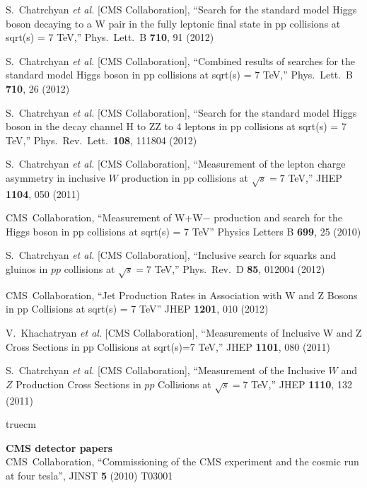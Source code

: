   S.~Chatrchyan {\it et al.}  [CMS Collaboration],
  ``Search for the standard model Higgs boson decaying to a W pair in the fully leptonic final state in pp collisions at sqrt(s) = 7 TeV,''
  Phys.\ Lett.\ B {\bf 710}, 91 (2012)

  S.~Chatrchyan {\it et al.}  [CMS Collaboration],
  ``Combined results of searches for the standard model Higgs boson in pp collisions at sqrt(s) = 7 TeV,''
  Phys.\ Lett.\ B {\bf 710}, 26 (2012)

  S.~Chatrchyan {\it et al.}  [CMS Collaboration],
  ``Search for the standard model Higgs boson in the decay channel H to ZZ to 4 leptons in pp collisions at sqrt(s) = 7 TeV,''
  Phys.\ Rev.\ Lett.\  {\bf 108}, 111804 (2012)

  S.~Chatrchyan {\it et al.} [CMS Collaboration],
  ``Measurement of the lepton charge asymmetry in inclusive $W$ production in pp collisions at $\sqrt{s} = 7$ TeV,''
  JHEP {\bf 1104}, 050 (2011)

  CMS~Collaboration,
  ``Measurement of W+W− production and search for the Higgs boson in pp collisions at sqrt(s) = 7 TeV''
  Physics Letters B {\bf 699}, 25 (2010)

  S.~Chatrchyan {\it et al.}  [CMS Collaboration],
  ``Inclusive search for squarks and gluinos in $pp$ collisions at $\sqrt{s}=7$ TeV,''
  Phys.\ Rev.\ D {\bf 85}, 012004 (2012)

  CMS~Collaboration,
  ``Jet Production Rates in Association with W and Z Bosons in pp Collisions at sqrt(s) = 7 TeV''
  JHEP {\bf 1201}, 010 (2012)

  V.~Khachatryan {\it et al.}  [CMS Collaboration],
  ``Measurements of Inclusive W and Z Cross Sections in pp Collisions at sqrt(s)=7 TeV,''
  JHEP {\bf 1101}, 080 (2011)

  S.~Chatrchyan {\it et al.} [CMS Collaboration],
  ``Measurement of the Inclusive $W$ and $Z$ Production Cross Sections in $pp$ Collisions at $\sqrt{s}=7$ TeV,''
  JHEP {\bf 1110}, 132 (2011)


 truecm

{\bf CMS detector papers}
\\

  CMS~Collaboration,
  ``Commissioning of the CMS experiment and the cosmic run at four tesla'',
  JINST {\bf 5} (2010) T03001

